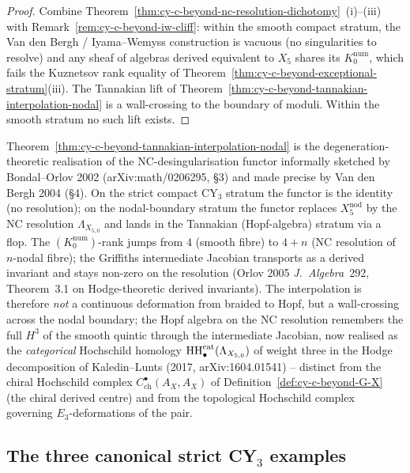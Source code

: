 \begin{proof}
Combine Theorem~\ref{thm:cy-c-beyond-nc-resolution-dichotomy}~(i)--(iii)
with Remark~\ref{rem:cy-c-beyond-iw-cliff}: within the smooth
compact stratum, the Van den Bergh / Iyama--Wemyss construction is
vacuous (no singularities to resolve) and any sheaf of algebras
derived equivalent to $X_5$ shares its $K_0^{\mathrm{num}}$, which
fails the Kuznetsov rank equality of
Theorem~\ref{thm:cy-c-beyond-exceptional-stratum}(iii). The
Tannakian lift of
Theorem~\ref{thm:cy-c-beyond-tannakian-interpolation-nodal} is a
wall-crossing to the boundary of moduli. Within the smooth stratum
no such lift exists.
\end{proof}

\begin{remark}
\label{rem:cy-c-beyond-nc-desing-functor}
Theorem~\ref{thm:cy-c-beyond-tannakian-interpolation-nodal} is the
degeneration-theoretic realisation of the NC-desingularisation
functor informally sketched by Bondal--Orlov 2002 (arXiv:math/0206295,
\S 3) and made precise by Van den Bergh 2004 (\S 4). On the strict
compact CY$_3$ stratum the functor is the identity (no resolution);
on the nodal-boundary stratum the functor replaces $X_5^{\mathrm{nod}}$
by the NC resolution $\Lambda_{X_{5,0}}$ and lands in the Tannakian
(Hopf-algebra) stratum via a flop. The $(K_0^{\mathrm{num}})$-rank
jumps from $4$ (smooth fibre) to $4 + n$ (NC resolution of $n$-nodal
fibre); the Griffiths intermediate Jacobian transports as a derived
invariant and stays non-zero on the resolution
(Orlov 2005 \emph{J.\ Algebra}\ 292, Theorem~3.1 on Hodge-theoretic
derived invariants). The interpolation is therefore \emph{not} a
continuous deformation from braided to Hopf, but a wall-crossing
across the nodal boundary; the Hopf algebra on the NC resolution
remembers the full $H^3$ of the smooth quintic through the intermediate
Jacobian, now realised as the \emph{categorical} Hochschild homology
$\mathrm{HH}^{\mathrm{cat}}_\bullet(\Lambda_{X_{5,0}})$ of weight three in the
Hodge decomposition of Kaledin--Lunts (2017, arXiv:1604.01541)
-- distinct from the chiral Hochschild complex
$C^\bullet_{\mathrm{ch}}(A_X, A_X)$ of
Definition~\ref{def:cy-c-beyond-G-X} (the chiral derived centre) and
from the topological Hochschild complex governing $E_3$-deformations
of the pair.
\end{remark}

\subsection{The three canonical strict CY\texorpdfstring{$_3$}{-3} examples}
\label{subsec:cy-c-beyond-joyce-three-examples}

